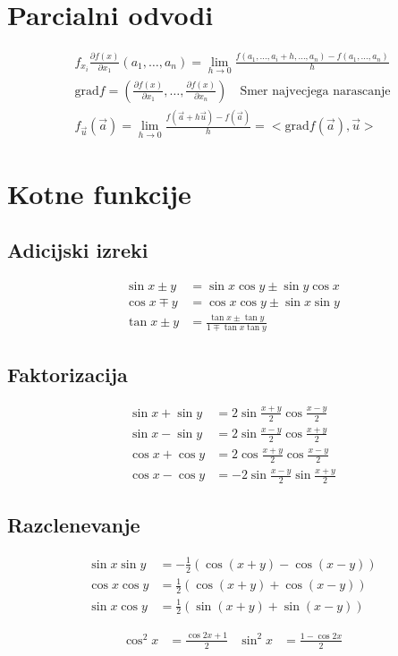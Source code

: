 \documentclass[a4paper,oneside,8pt]{extarticle}
\theoremstyle{definition}
\newcommand{\dpar}[2]{\ensuremath{\frac{\partial #1}{\partial #2}}}
\newcommand\okr[1]{\left(#1\right)}
\begin{document}
\begin{multicols}{2}
	\section*{Parcialni odvodi}
	\begin{align*}
		f_{x_i}\dpar{f(x)}{x_1} (a_1, \dots ,a_n) = \lim_{h \to 0} \frac{f(a_1,\dots,a_i + h, \dots , a_n) - f(a_1,\dots,a_n)}{h}\\
		\text{grad} f = \okr{\dpar{f(x)}{x_1}, \dots, \dpar{f(x)}{x_n}} \quad \text{Smer najvecjega narascanje}\\
		f_{\vec{u}}(\vec{a}) = \lim_{h \to 0} \frac{f(\vec{a} + h\vec{u}) - f(\vec{a})}{h} = <\text{grad} f(\vec{a}), \vec{u}>
	\end{align*}	
%
	\section*{Kotne funkcije}
	\subsection*{Adicijski izreki}
	\begin{align*}
		\sin{x \pm y} &= \sin{x}\cos{y} \pm \sin{y}\cos{x}\\
		\cos{x \mp y} &= \cos{x}\cos{y} \pm \sin{x}\sin{y}\\
		\tan{x \pm y} &= \frac{\tan{x} \pm \tan{y}}{1 \mp \tan{x}\tan{y}}
	\end{align*}
	\subsection*{Faktorizacija}
	\begin{align*}
		\sin{x} + \sin{y} &= 2\sin{\frac{x+y}{2}} \cos{\frac{x-y}{2}}\\
		\sin{x} - \sin{y} &= 2\sin{\frac{x-y}{2}} \cos{\frac{x+y}{2}}\\
		\cos{x} + \cos{y} &= 2\cos{\frac{x+y}{2}} \cos{\frac{x-y}{2}}\\
		\cos{x} - \cos{y} &= -2\sin{\frac{x-y}{2}} \sin{\frac{x+y}{2}}
	\end{align*}
	\subsection*{Razclenevanje}
	\begin{align*}
		\sin{x}\sin{y} &= -\frac{1}{2}\left(\cos{(x+y)} - \cos{(x-y)} \right)\\
		\cos{x}\cos{y} &= \frac{1}{2}\left(\cos{(x+y)} + \cos{(x-y)} \right)\\
		\sin{x}\cos{y} &= \frac{1}{2}\left(\sin{(x+y)} + \sin{(x-y)} \right)
	\end{align*}

	\begin{align*}
		\cos^2{x} &= \frac{\cos{2x} + 1}{2} & \sin^2{x} &= \frac{1 - \cos{2x}}{2}
	\end{align*}	


\end{multicols}
\end{document}
